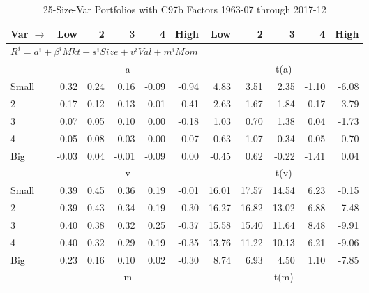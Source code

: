 
\begin{table}[!ht]
\footnotesize
\centering
\caption{25-Size-Var Portfolios with C97b Factors 1963-07 through 2017-12}
\begin{tabular}{lrrrrrrrrrr}
  \toprule
    Var $\rightarrow$ & Low & 2 & 3 & 4 & High & Low & 2 & 3 & 4 & High \\ 
  \midrule
  \multicolumn{11}{l}{$R^i=a^i+\beta^iMkt+s^iSize+v^iVal+m^iMom$} \\

  
    
      & \multicolumn{5}{c}{a} & \multicolumn{5}{c}{t(a)}
    
    \\
      \cmidrule(r){2-6} \cmidrule(r){7-11}

    Small   & 0.32  & 0.24  & 0.16  & -0.09  & -0.94  & 4.83  & 3.51  & 2.35  & -1.10  & -6.08  \\
         2  & 0.17  & 0.12  & 0.13  & 0.01  & -0.41  & 2.63  & 1.67  & 1.84  & 0.17  & -3.79  \\
         3  & 0.07  & 0.05  & 0.10  & 0.00  & -0.18  & 1.03  & 0.70  & 1.38  & 0.04  & -1.73  \\
         4  & 0.05  & 0.08  & 0.03  & -0.00  & -0.07  & 0.63  & 1.07  & 0.34  & -0.05  & -0.70  \\
    Big     & -0.03  & 0.04  & -0.01  & -0.09  & 0.00  & -0.45  & 0.62  & -0.22  & -1.41  & 0.04  \\

  
    
      & \multicolumn{5}{c}{v} & \multicolumn{5}{c}{t(v)}
    
    \\
      \cmidrule(r){2-6} \cmidrule(r){7-11}

    Small   & 0.39  & 0.45  & 0.36  & 0.19  & -0.01  & 16.01  & 17.57  & 14.54  & 6.23  & -0.15  \\
         2  & 0.39  & 0.43  & 0.34  & 0.19  & -0.30  & 16.27  & 16.82  & 13.02  & 6.88  & -7.48  \\
         3  & 0.40  & 0.38  & 0.32  & 0.25  & -0.37  & 15.58  & 15.40  & 11.64  & 8.48  & -9.91  \\
         4  & 0.40  & 0.32  & 0.29  & 0.19  & -0.35  & 13.76  & 11.22  & 10.13  & 6.21  & -9.06  \\
    Big     & 0.23  & 0.16  & 0.10  & 0.02  & -0.30  & 8.74  & 6.93  & 4.50  & 1.10  & -7.85  \\

  
    
      & \multicolumn{5}{c}{m} & \multicolumn{5}{c}{t(m)}
    

\end{tabular}
\end{table}
